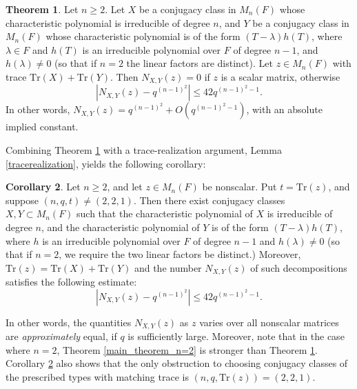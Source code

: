 \documentclass[preprint,11pt]{amsart}
\theoremstyle{definition}
\newtheorem{thm}{Theorem}
\numberwithin{thm}{section}
\newtheorem{cor}[thm]{Corollary}
\newcommand{\abs}[1]{\left| #1 \right|}
\newcommand{\tit}[1]{\textit{#1}}
\newcommand{\tr}{\textrm{Tr}}
\newcommand{\sub}{\subset}
\begin{document}
\begin{thm}\label{mainthm1}
Let  $n \geq 2$. Let $X$ be a conjugacy class in $M_n(F)$ whose characteristic polynomial is irreducible of degree $n$, and $Y$ be a conjugacy class in $M_n(F)$ whose characteristic polynomial is of the form $(T - \lambda)h(T)$, where $\lambda \in F$ and $h(T)$ is an irreducible polynomial over $F$ of degree $n-1$, and $h(\lambda) \neq 0$ (so that if $n =2$ the linear factors are distinct). Let $z \in M_n(F)$ with trace $\textrm{Tr}(X) + \textrm{Tr}(Y)$. Then $N_{X, Y}(z) =0$ if $z$ is a scalar matrix, otherwise
$$
\abs{N_{X, Y} (z) - q^{(n-1)^2} } \leq 42 q^{(n-1)^2-1}.
$$
In other words, $N_{X, Y}(z) = q^{(n-1)^2} + O\left(q^{(n-1)^2 -1} \right)$, with an absolute implied constant. 
\end{thm}

\noindent Combining Theorem \ref{mainthm1} with a trace-realization argument, Lemma \ref{tracerealization}, yields the following corollary:

\begin{cor}\label{cor2}
Let $n \geq 2$, and let $z \in M_n(F)$ be nonscalar. Put $t = \tr(z)$, and suppose $(n,q, t) \neq (2,2,1)$.  Then there exist conjugacy classes $X, Y \sub M_n(F)$ such that the characteristic polynomial of $X$ is irreducible of degree $n$, and the characteristic polynomial of $Y$ is of the form $(T - \lambda) h(T)$, where $h$ is an irreducible polynomial over $F$ of degree $n-1$ and $h(\lambda) \neq 0$ (so that if $n = 2$, we require the two linear factors be distinct.) Moreover, $\tr(z)= \tr(X) + \tr(Y)$ and the number $N_{X,Y}(z)$ of such decompositions satisfies the following estimate:
$$
\left| N_{X,Y}(z) - q^{(n-1)^2} \right| \leq 42 q^{(n-1)^2 -1}.
$$
\end{cor}
\noindent In other words, the quantities $N_{X,Y}(z)$ as $z$ varies over all nonscalar matrices are \tit{approximately} equal, if $q$ is sufficiently large. Moreover, note that in the case where $n = 2$, Theorem \ref{main_theorem_n=2} is stronger than Theorem \ref{mainthm1}. Corollary \ref{cor2} also shows that the only obstruction to choosing conjugacy classes of the prescribed types with matching trace is $(n,q, \tr(z)) = (2, 2, 1)$. 
\end{document}
